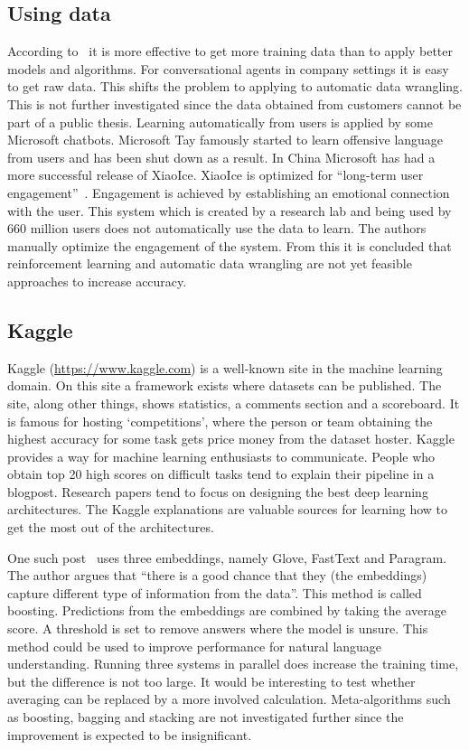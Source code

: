 \subsection{Using data}
\label{subsec:using_data}
According to~\citet{warden2018} it is more effective to get more training data than to apply better models and algorithms.
For conversational agents in company settings it is easy to get raw data.
This shifts the problem to applying to automatic data wrangling.
This is not further investigated since the data obtained from customers cannot be part of a public thesis.
Learning automatically from users is applied by some Microsoft chatbots.
Microsoft Tay famously started to learn offensive language from users and has been shut down as a result.
In China Microsoft has had a more successful release of XiaoIce.
XiaoIce is optimized for ``long-term user engagement''~\citep{zhou2018design}.
Engagement is achieved by establishing an emotional connection with the user.
This system which is created by a research lab and being used by 660 million users does not automatically use the data to learn.
The authors manually optimize the engagement of the system.
From this it is concluded that reinforcement learning and automatic data wrangling are not yet feasible approaches to increase accuracy.

\subsection{Kaggle}
\label{subsec:kaggle}
Kaggle (\url{https://www.kaggle.com}) is a well-known site in the machine learning domain.
On this site a framework exists where datasets can be published.
The site, along other things, shows statistics, a comments section and a scoreboard.
It is famous for hosting `competitions', where the person or team obtaining the highest accuracy for some task gets price money from the dataset hoster.
Kaggle provides a way for machine learning enthusiasts to communicate.
People who obtain top 20 high scores on difficult tasks tend to explain their pipeline in a blogpost.
Research papers tend to focus on designing the best deep learning architectures.
The Kaggle explanations are valuable sources for learning how to get the most out of the architectures.

One such post~\citep{kumar2018} uses three embeddings, namely Glove, FastText and Paragram.
The author argues that ``there is a good chance that they (the embeddings) capture different type of information from the data''.
This method is called boosting.
Predictions from the embeddings are combined by taking the average score.
A threshold is set to remove answers where the model is unsure.
This method could be used to improve performance for natural language understanding.
Running three systems in parallel does increase the training time, but the difference is not too large.
It would be interesting to test whether averaging can be replaced by a more involved calculation.
Meta-algorithms such as boosting, bagging and stacking are not investigated further since the improvement is expected to be insignificant.

